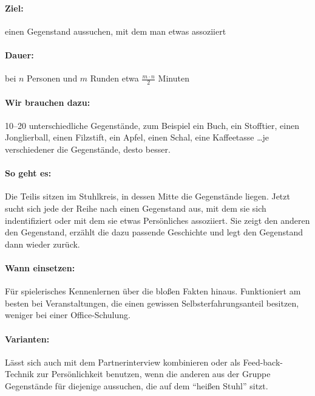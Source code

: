 \paragraph{Ziel:} einen Gegenstand aussuchen, mit dem man etwas assoziiert
\paragraph{Dauer:} bei $n$ Personen und $m$ Runden etwa $\frac{m\cdot n}{2}$ Minuten \
\paragraph{Wir brauchen dazu:} 10--20 unterschiedliche Gegenstände, zum Beispiel ein Buch, ein Stofftier, einen Jonglierball, einen Filzstift, ein Apfel, einen Schal, eine Kaffeetasse \ldots je verschiedener die Gegenstände, desto besser.
\paragraph{So geht es:} Die Teilis sitzen im Stuhlkreis, in dessen Mitte die Gegenstände liegen. Jetzt sucht sich jede der Reihe nach einen Gegenstand aus, mit dem sie sich indentifiziert oder mit dem sie etwas Persönliches assoziiert. Sie zeigt den anderen den Gegenstand, erzählt die dazu passende Geschichte und legt den Gegenstand dann wieder zurück.
\paragraph{Wann einsetzen:} Für spielerisches Kennenlernen über die bloßen Fakten hinaus. Funktioniert am besten bei Veranstaltungen, die einen gewissen Selbsterfahrungsanteil besitzen, weniger bei einer Office-Schulung.
\paragraph{Varianten:} Lässt sich auch mit dem Partnerinterview kombinieren oder als Feed-back-Technik zur Persönlichkeit benutzen, wenn die anderen aus der Gruppe Gegenstände für diejenige aussuchen, die auf dem "`heißen Stuhl"' sitzt.

